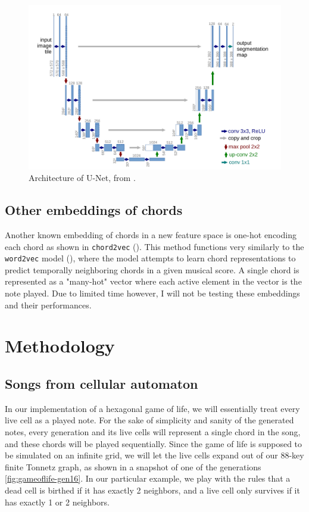 \documentclass[
	a4paper, %
	10pt, %
	unnumberedsections, %
	twoside, %
]{LTJournalArticle}
\begin{document}
\begin{figure}
    \centering
    \includegraphics[width=\linewidth]{images/unet-arch.png}
    \caption{Architecture of U-Net, from \textcite{ronneberger_u-net_2015}.}
    \label{fig:unet-arch}
\end{figure}

\subsection{Other embeddings of chords}

Another known embedding of chords in a new feature space is one-hot encoding each chord as shown in \texttt{chord2vec} (\textcite{madjiheurem_chord2vec_2016}). This method functions very similarly to the \texttt{word2vec} model (\textcite{mikolov_efficient_2013}), where the model attempts to learn chord representations to predict temporally neighboring chords in a given musical score. A single chord is represented as a "many-hot" vector where each active element in the vector is the note played. Due to limited time however, I will not be testing these embeddings and their performances.

\section{Methodology}

\subsection{Songs from cellular automaton}

In our implementation of a hexagonal game of life, we will essentially treat every live cell as a played note. For the sake of simplicity and sanity of the generated notes, every generation and its live cells will represent a single chord in the song, and these chords will be played sequentially. Since the game of life is supposed to be simulated on an infinite grid, we will let the live cells expand out of our 88-key finite Tonnetz graph, as shown in a snapshot of one of the generations \autoref{fig:gameoflife-gen16}. In our particular example, we play with the rules that a dead cell is birthed if it has exactly 2 neighbors, and a live cell only survives if it has exactly 1 or 2 neighbors.
\end{document}
